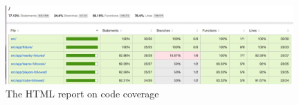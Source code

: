 \begin{figure}[H]
\begin{center}
\includegraphics[width=11cm]{figures/testing_coverage_metrics}
\end{center}
\caption{The HTML report on code coverage}
\label{fig:testing_coverage_metrics}
\end{figure}
